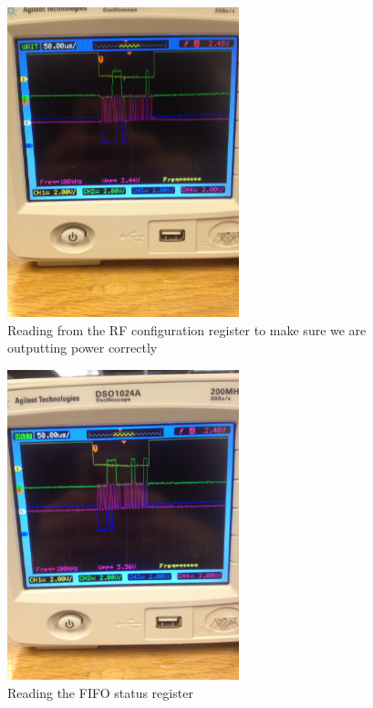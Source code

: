 \documentclass{article}
\begin{document}
\begin{figure}[H]
    \centering
    \includegraphics[width=0.6\textwidth,angle=-90]{pwr_config_read.jpg}
    \caption{Reading from the RF configuration register to make sure we are outputting power correctly}
\end{figure}

\begin{figure}[H]
    \centering
    \includegraphics[width=0.6\textwidth,angle=-90]{fifo_status_read.jpg}
    \caption{Reading the FIFO status register}
\end{figure}
\end{document}
